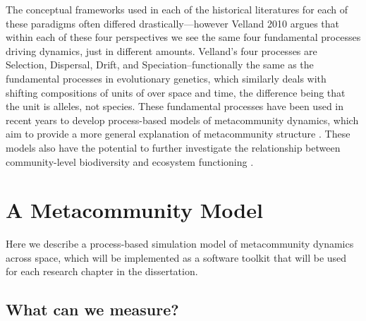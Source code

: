 \documentclass[]{article}
\begin{document}
The conceptual frameworks used in each of the historical literatures for each of these paradigms often differed drastically---however Velland 2010 \citep{vellend_conceptual_2010} argues that within each of these four perspectives we see the same four
fundamental processes driving dynamics, just in different amounts.
Velland's four processes are Selection, Dispersal, Drift, and
Speciation--functionally the same as the fundamental processes in
evolutionary genetics, which similarly deals with shifting compositions
of units of over space and time, the difference being that the unit is alleles, not species. These fundamental processes have been used in recent years to develop process-based models of
metacommunity dynamics, which aim to provide a more general explanation of metacommunity structure \citep{poisot_beyond_2015, poisot_ecologicalnetworksjl_2019, poisot_structure_2016, thompson_loss_2017, advani_statistical_2018}.  These models also have the potential to further investigate the relationship between community-level biodiversity and ecosystem functioning \cite{gonzalez_scaling-up_2020, mitchell_forest_2014}.



%
%
%

\hypertarget{a-metacommunity-model}{%
\section{A Metacommunity Model}\label{a-metacommunity-model}}

Here we describe a process-based simulation model of metacommunity
dynamics across space, which will be implemented as a software toolkit
that will be used for each research chapter in the dissertation.


\hypertarget{what-can-we-measure}{%
\subsection{What can we measure?}\label{what-can-we-measure}}
\end{document}
